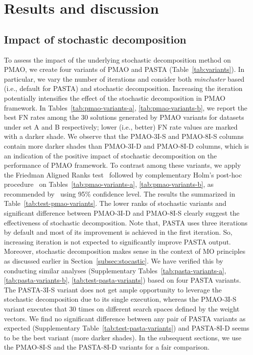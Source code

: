\section{Results and discussion}
\label{sec:experiment}

\subsection{Impact of stochastic decomposition}
To assess the impact of the underlying stochastic decomposition method on PMAO, we create four variants of PMAO and PASTA (Table~\ref{tab:variants}). In particular, we vary the number of iterations and consider both \textit{mincluster} based (i.e., default for PASTA) and stochastic decomposition. Increasing the iteration potentially intensifies the effect of the stochastic decomposition in PMAO framework. In Tables~\ref{tab:pmao-variants-a},  \ref{tab:pmao-variants-b}, we report the best FN rates among the 30 solutions generated by PMAO variants for datasets under set A and B respectively; lower (i.e., better) FN rate values are marked with a darker shade.
We observe that the PMAO-3I-S and PMAO-8I-S columns contain more darker shades than PMAO-3I-D and PMAO-8I-D columns, which is an indication of the positive impact of stochastic decomposition on the performance of PMAO framework. To contrast among these variants, we apply the Friedman Aligned Ranks test~\cite{hodges2012rank} followed by complementary Holm’s post-hoc procedure~\cite{holm1979simple} on Tables~\ref{tab:pmao-variants-a},  \ref{tab:pmao-variants-b}, as recommended by~\cite{derrac2011practical, rodriguez-fdez2015stac} using 95\% confidence level. The results the summarized in Table~\ref{tab:test-pmao-variants}. The lower ranks of stochastic variants and significant difference between PMAO-3I-D and PMAO-8I-S clearly suggest the effectiveness of stochastic decomposition. Note that, PASTA uses three iterations by default and most of its improvement is achieved in the first iteration. So, increasing iteration is not expected to significantly improve PASTA output. Moreover, stochastic decomposition makes sense in the context of MO principles as discussed earlier in Section~\ref{subsec:stocastic}. We have verified this by conducting similar analyses (Supplementary Tables~\ref{tab:pasta-variants-a}, \ref{tab:pasta-variants-b},  \ref{tab:test-pasta-variants}) based on four PASTA variants. The PASTA-3I-S variant does not get ample opportunity to leverage the stochastic decomposition due to its single execution, whereas the PMAO-3I-S variant executes that 30 times on different search spaces defined by the weight vectors. We find no significant difference between any pair of PASTA variants as expected (Supplementary Table~\ref{tab:test-pasta-variants}) and PASTA-8I-D seems to be the best variant (more darker shades). In the subsequent sections, we use the PMAO-8I-S and the PASTA-8I-D variants  for a fair comparison. 

